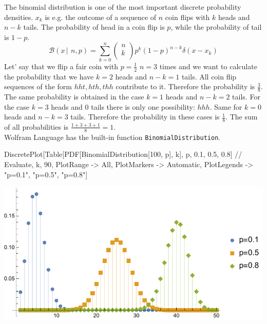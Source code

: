 \documentclass{tstextbook}
\begin{document}
\begin{example}
The binomial distribution is one of the most important discrete probability densities. $x_k$ is e.g. the outcome of a sequence of $n$ coin flips with $k$ heads and $n-k$ tails. The probability of head in a coin flip is $p$, while the probability of tail is $1-p$.  
  \begin{equation}
    \mathcal{B}(x\,\vert\,\ n,p)=\sum_{k=0}^n\left(\begin{array}{c}
n \\
k \\
\end{array}\right)p^k(1-p)^{n-k}\delta(x-x_k)
  \end{equation}
   Let' say that we flip a fair coin with $p=\frac{1}{2}$ $n=3$ times and we want to calculate the probability that we have $k=2$ heads and $n-k=1$ tails. All coin flip sequences of the form $hht,hth,thh$ contribute to it. Therefore the probability is $\frac{3}{8}$. The same probability is obtained in the case $k=1$ heads and $n-k=2$ tails. For the case $k=3$ heads and $0$ tails there is only one possibility: $hhh$. Same for $k=0$ heads and $n-k=3$ tails. Therefore the probability in these cases is $\frac{1}{8}$. The sum of all probabilities is $\frac{1+3+3+1}{8}=1$.\\

Wolfram Language has the built-in function \texttt{BinomialDistribution}.
\begin{mathematica}
DiscretePlot[Table[PDF[BinomialDistribution[100, p], k], 
             {p, {0.1, 0.5, 0.8}}] // Evaluate, 
             {k, 90}, PlotRange -> All, PlotMarkers -> Automatic, 
             PlotLegends -> {"p=0.1", "p=0.5", "p=0.8"}]
\end{mathematica}
\includegraphics[scale=0.9]{images/binomial_distribution.pdf} 
\end{example}
\end{document}
